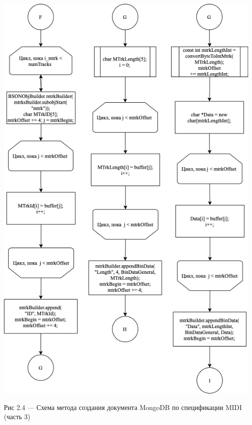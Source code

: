 \begin{center}
		\includegraphics[scale=0.7]{tex/img/Parser3_1.png}
		
			Рис 2.4 — Схема метода создания документа MongoDB по спецификации MIDI (часть 3)
\end{center}

